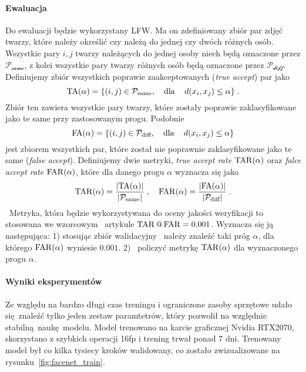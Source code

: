 \paragraph{Ewaluacja}
Do ewaluacji będzie wykorzystany LFW. Ma on zdefiniowany zbiór
par zdjęć twarzy, które należy określić czy należą do jednej czy dwóch różnych osób.
Wszystkie pary \(i,j\) twarzy należących do jednej osoby niech będą oznaczone przez
\(\mathcal{P_\text{same}}\), z kolei wszystkie pary twarzy różnych osób będą oznaczone przez
\(\mathcal{P_\text{diff}}\).
Definiujemy zbiór wszystkich poprawie zaakceptowanych (\emph{true accept}) par jako 
\begin{equation}
    \operatorname{TA}(\alpha)=\{(i,j)\in\mathcal{P_\text{same}}, \quad \text{dla} \quad \,d(x_i,x_j)\leq \alpha\}\;.
\end{equation}
Zbiór ten zawiera wszystkie pary twarzy, które zostały poprawie zaklasyfikowane jako te same przy zastosowanym progu. Podobnie 
\begin{equation}
  \operatorname{FA}(\alpha)=\{(i,j)\in\mathcal{P_\text{diff}}, \quad \text{dla} \quad \,d(x_i,x_j)\leq \alpha\}
\end{equation}
jest zbiorem wszystkich par, które został nie poprawnie zaklasyfikowane jako te same (\emph{false accept}).
Definiujemy dwie metryki, \emph{true accept rate} \(\operatorname{TAR}(\alpha)\) oraz \emph{falce accept rate} \(\operatorname{FAR}(\alpha)\), które dla danego progu \(\alpha\) wyznacza się jako
\begin{equation}
    \operatorname{TAR}(\alpha)=\frac{\left|\operatorname{TA}(\alpha)\right|}{\left|\mathcal{P_\text{same}}\right|}\;,\quad
    \operatorname{FAR}(\alpha)=\frac{\left|\operatorname{FA}(\alpha)\right|}{\left|\mathcal{P_\text{diff}}\right|}\;.
\end{equation}
 Metryka, która będzie wykorzystywana do oceny jakości weryfikacji to stosowana we wzorcowym
 artykule \(\tar@\far=\num{0.001}\). Wyznacza się ją następująca: 1) stosując zbiór walidacyjny
 należy znaleźć taki próg \(\alpha\), dla którego \(\operatorname{FAR}(\alpha)\) wyniesie \(\num{0.001}\). 2)
 policzyć metrykę \(\operatorname{TAR}(\alpha)\) dla wyznaczonego progu \(\alpha\).
  
\paragraph{Wyniki eksperymentów}

Ze względu na bardzo długi czas treningu i ograniczone zasoby sprzętowe udało się znaleźć tylko jeden zestaw paramtetrów, który pozwolił na względnie stabilną naukę modelu. Model trenowano  na karcie graficznej Nvidia RTX2070, skorzystano z szybkich operacji 16fp i trening trwał ponad 7 dni. Trenowany model był co kilka tysiecy kroków walidowany, co zostało zwizualizowane na rysunku~\ref{fig:facenet_train}.

